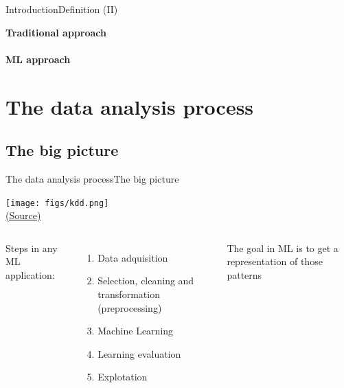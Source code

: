 \documentclass[10pt,compress]{beamer} %
\begin{document}
\begin{frame}{Introduction}{Definition (II)}
    \vspace{-0.5cm}
	\begin{center}
	\textbf{Traditional approach}\\
	\\
	\bigskip
	\textbf{ML approach}\\
	
	\end{center}	
\end{frame}

\section{The data analysis process}
\subsection{The big picture}
\begin{frame}{The data analysis process}{The big picture}
	\begin{center}
	\texttt{[image: figs/kdd.png]}\\
    \tiny{\href{https://www.researchgate.net/figure/The-steps-of-the-KDD-process_fig6_297734487}{(Source)}}
	\end{center}

	\begin{columns}
		Steps in any ML application:
		\begin{enumerate}
			\item Data adquisition
			\item Selection, cleaning and transformation (\alert{preprocessing})
			\item Machine Learning
			\item Learning evaluation
			\item Explotation
		\end{enumerate}

	   \begin{block}{}
	   		The goal in ML is to get a representation of those patterns
	   \end{block}
	\end{columns}
\end{frame}
\end{document}
